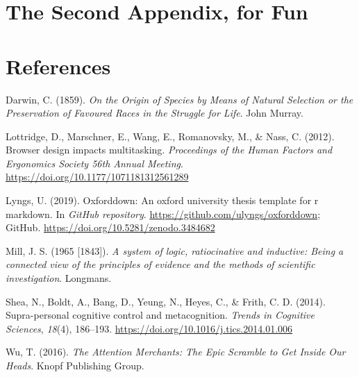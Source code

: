 \documentclass[a4paper, nobind]{templates/ociamthesis}
\newlength{\cslhangindent}
\newenvironment{CSLReferences}[2] %
 {%
  \setlength{\parindent}{0pt}
  \ifodd #1
  \let\oldpar\par
  \def\par{\hangindent=\cslhangindent\oldpar}
  \fi
  \setlength{\parskip}{1mm}
  \setlength{\baselineskip}{6mm}
 }%
 {}
\begin{document}
\hypertarget{the-second-appendix-for-fun}{%
\chapter{The Second Appendix, for Fun}\label{the-second-appendix-for-fun}}

\hypertarget{references}{%
\chapter*{References}\label{references}}


\hypertarget{refs}{}
\begin{CSLReferences}{1}{0}
\leavevmode{}%
Darwin, C. (1859). \emph{{On the Origin of Species by Means of Natural Selection or the Preservation of Favoured Races in the Struggle for Life}}. John Murray.

\leavevmode{}%
Lottridge, D., Marschner, E., Wang, E., Romanovsky, M., \& Nass, C. (2012). {Browser design impacts multitasking}. \emph{Proceedings of the Human Factors and Ergonomics Society 56th Annual Meeting}. \url{https://doi.org/10.1177/1071181312561289}

\leavevmode{}%
Lyngs, U. (2019). Oxforddown: An oxford university thesis template for r markdown. In \emph{GitHub repository}. \url{https://github.com/ulyngs/oxforddown}; GitHub. \url{https://doi.org/10.5281/zenodo.3484682}

\leavevmode{}%
Mill, J. S. (1965 {[}1843{]}). \emph{A system of logic, ratiocinative and inductive: Being a connected view of the principles of evidence and the methods of scientific investigation}. Longmans.

\leavevmode{}%
Shea, N., Boldt, A., Bang, D., Yeung, N., Heyes, C., \& Frith, C. D. (2014). {Supra-personal cognitive control and metacognition}. \emph{Trends in Cognitive Sciences}, \emph{18}(4), 186--193. \url{https://doi.org/10.1016/j.tics.2014.01.006}

\leavevmode{}%
Wu, T. (2016). \emph{{The Attention Merchants: The Epic Scramble to Get Inside Our Heads}}. Knopf Publishing Group.

\end{CSLReferences}

\end{document}
